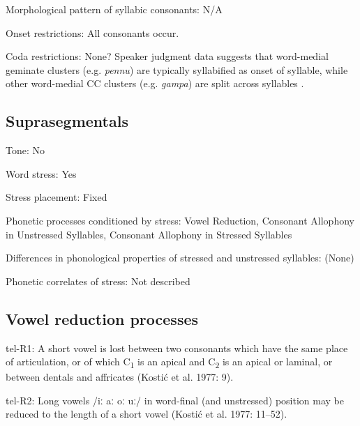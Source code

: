 {\begin{appendixdesc}
\item[Morphological pattern of syllabic consonants:] N/A

\item[Onset restrictions:] All consonants occur. 

\item[Coda restrictions:] None? Speaker judgment data suggests that word-medial geminate clusters (e.g. \textit{pennu}) are typically syllabified as onset of syllable, while other word-medial CC clusters (e.g. \textit{gampa}) are split across syllables \citep{Sailaja1999}.
\end{appendixdesc}
\subsection*{Suprasegmentals}
\begin{appendixdesc}
\item[Tone:] No

\item[Word stress:] Yes

\item[Stress placement:] Fixed

\item[Phonetic processes conditioned by stress:] Vowel Reduction, Consonant Allophony in Unstressed Syllables, Consonant Allophony in Stressed Syllables

\item[Differences in phonological properties of stressed and unstressed syllables:] (None)

\item[Phonetic correlates of stress:] Not described
\end{appendixdesc}
\subsection*{Vowel reduction processes}
\begin{appendixdesc}

\item[tel-R1:] A short vowel is lost between two consonants which have the same place of articulation, or of which C\textsubscript{1} is an apical and C\textsubscript{2} is an apical or laminal, or between dentals and affricates (Kostić et al. 1977: 9).

\item[tel-R2:] Long vowels /iː aː oː uː/ in word-final (and unstressed) position may be reduced to the length of a short vowel (Kostić et al. 1977: 11--52).


\end{appendixdesc}}
